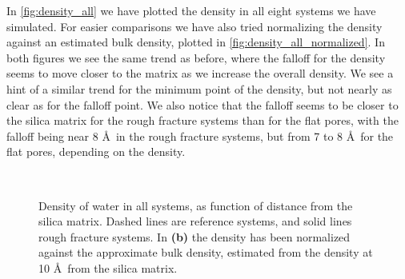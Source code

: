 In \cref{fig:density_all} we have plotted the density in all eight systems we have simulated. For easier comparisons we have also tried normalizing the density against an estimated bulk density, plotted in \cref{fig:density_all_normalized}. In both figures we see the same trend as before, where the falloff for the density seems to move closer to the matrix as we increase the overall density. We see a hint of a similar trend for the minimum point of the density, but not nearly as clear as for the falloff point. We also notice that the falloff seems to be closer to the silica matrix for the rough fracture systems than for the flat pores, with the falloff being near 8 \AA\ in the rough fracture systems, but from 7 to 8 \AA\ for the flat pores, depending on the density.
%
\begin{figure}[!p]%
    \centering%
    \setlength{\myfigwidth}{0.88\textwidth}%
    \setlength{\mycaptionwidth}{0.09999\textwidth}%
    \begin{minipage}[c]{\myfigwidth}%
    \end{minipage}%
    \begin{minipage}[c]{\mycaptionwidth}%
        \subcaption{\label{fig:density_all}}%
    \end{minipage}%
    \\%
    \begin{minipage}[c]{\myfigwidth}%
    \end{minipage}%
    \begin{minipage}[c]{\mycaptionwidth}%
        \subcaption{\label{fig:density_all_normalized}}%
    \end{minipage}%
    \captionsetup{width=\textwidth}%
    \caption{%
        Density of water in all systems, as function of distance from the silica matrix. Dashed lines are reference systems, and solid lines rough fracture systems. In \textbf{(b)} the density has been normalized against the approximate bulk density, estimated from the density at 10 \AA\ from the silica matrix. %
        \label{fig:last_density_fig}%
    }%
\end{figure}%

